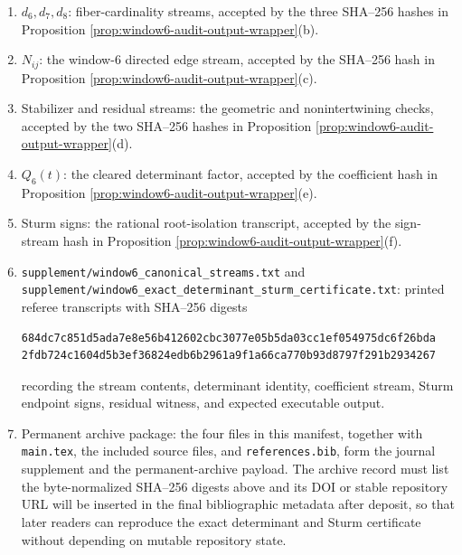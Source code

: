 \begin{proposition}
\begin{enumerate}[label=\textup{(\alph*)}]
\begin{center}
\begin{minipage}{0.92\linewidth}
\end{minipage}
\end{center}
and expected output
\begin{center}
\texttt{window6 canonical streams: all assertions passed}.
\end{center}
This second verifier checks the canonical fiber, edge, stabilizer, and residual streams but not the determinant or Sturm sequence.
\item \(d_6,d_7,d_8\): fiber-cardinality streams, accepted by the three SHA--256 hashes in Proposition \ref{prop:window6-audit-output-wrapper}\textup{(b)}.
\item \(N_{ij}\): the window-\(6\) directed edge stream, accepted by the SHA--256 hash in Proposition \ref{prop:window6-audit-output-wrapper}\textup{(c)}.
\item Stabilizer and residual streams: the geometric and nonintertwining checks, accepted by the two SHA--256 hashes in Proposition \ref{prop:window6-audit-output-wrapper}\textup{(d)}.
\item \(Q_6(t)\): the cleared determinant factor, accepted by the coefficient hash in Proposition \ref{prop:window6-audit-output-wrapper}\textup{(e)}.
\item Sturm signs: the rational root-isolation transcript, accepted by the sign-stream hash in Proposition \ref{prop:window6-audit-output-wrapper}\textup{(f)}.
\item \texttt{supplement/window6\_canonical\_streams.txt} and \texttt{supplement/window6\_exact\_determinant\_sturm\_certificate.txt}: printed referee transcripts with SHA--256 digests
\begin{center}
\begin{minipage}{0.92\linewidth}
\begin{Verbatim}[breaklines=true,breakanywhere=true,fontsize=\scriptsize]
684dc7c851d5ada7e8e56b412602cbc3077e05b5da03cc1ef054975dc6f26bda
2fdb724c1604d5b3ef36824edb6b2961a9f1a66ca770b93d8797f291b2934267
\end{Verbatim}
\end{minipage}
\end{center}
recording the stream contents, determinant identity, coefficient stream, Sturm endpoint signs, residual witness, and expected executable output.
\item Permanent archive package: the four files in this manifest, together with \texttt{main.tex}, the included source files, and \texttt{references.bib}, form the journal supplement and the permanent-archive payload.  The archive record must list the byte-normalized SHA--256 digests above and its DOI or stable repository URL will be inserted in the final bibliographic metadata after deposit, so that later readers can reproduce the exact determinant and Sturm certificate without depending on mutable repository state.

\end{enumerate}
\end{proposition}
